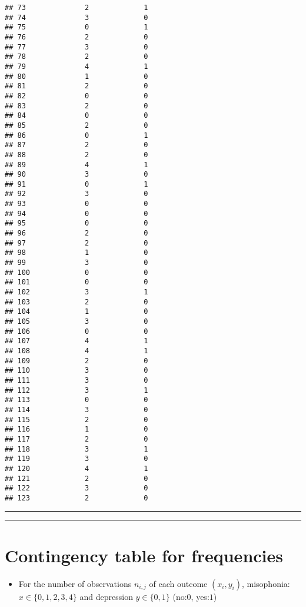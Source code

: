 \documentclass[
]{book}
\providecommand{\tightlist}{%
  \setlength{\itemsep}{0pt}\setlength{\parskip}{0pt}}
\begin{document}
\begin{verbatim}
## 73              2             1
## 74              3             0
## 75              0             1
## 76              2             0
## 77              3             0
## 78              2             0
## 79              4             1
## 80              1             0
## 81              2             0
## 82              0             0
## 83              2             0
## 84              0             0
## 85              2             0
## 86              0             1
## 87              2             0
## 88              2             0
## 89              4             1
## 90              3             0
## 91              0             1
## 92              3             0
## 93              0             0
## 94              0             0
## 95              0             0
## 96              2             0
## 97              2             0
## 98              1             0
## 99              3             0
## 100             0             0
## 101             0             0
## 102             3             1
## 103             2             0
## 104             1             0
## 105             3             0
## 106             0             0
## 107             4             1
## 108             4             1
## 109             2             0
## 110             3             0
## 111             3             0
## 112             3             1
## 113             0             0
## 114             3             0
## 115             2             0
## 116             1             0
## 117             2             0
## 118             3             1
## 119             3             0
## 120             4             1
## 121             2             0
## 122             3             0
## 123             2             0
\end{verbatim}

\begin{center}\rule{0.5\linewidth}{0.5pt}\end{center}

\begin{center}\rule{0.5\linewidth}{0.5pt}\end{center}

\hypertarget{contingency-table-for-frequencies}{%
\section{Contingency table for frequencies}\label{contingency-table-for-frequencies}}

\begin{itemize}
\tightlist
\item
  For the number of observations \(n_{i,j}\) of each outcome \((x_i, y_i)\), misophonia: \(x\in \{0,1,2,3,4\}\) and depression \(y\in \{0,1\}\) (no:\(0\), yes:\(1\))
\end{itemize}
\end{document}
